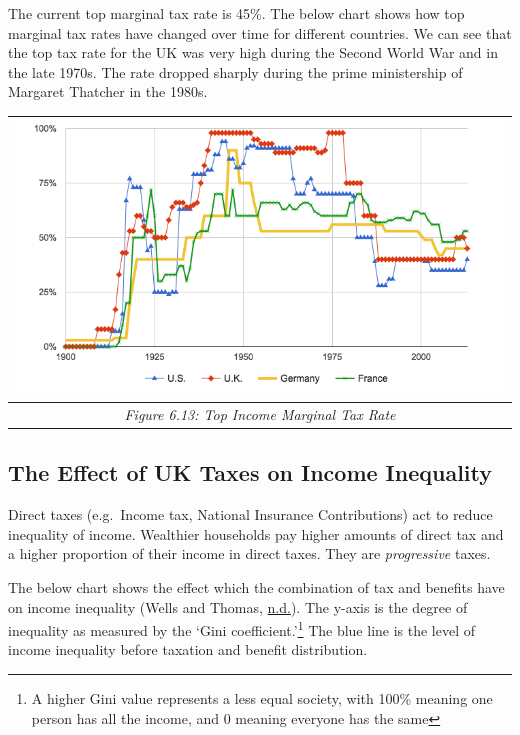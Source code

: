 \documentclass[]{tufte-handout}
\begin{document}
The current top marginal tax rate is 45\%. The below chart shows how top
marginal tax rates have changed over time for different countries. We
can see that the top tax rate for the UK was very high during the Second
World War and in the late 1970s. The rate dropped sharply during the
prime ministership of Margaret Thatcher in the 1980s.

\begin{longtable}[]{@{}c@{}}
\toprule
\includegraphics{ChapterPictures/6-12-TopIncomeMTR.png}\tabularnewline
\midrule
\endhead
\emph{Figure 6.13: Top Income Marginal Tax Rate}\tabularnewline
\bottomrule
\end{longtable}

\hypertarget{the-effect-of-uk-taxes-on-income-inequality}{%
\subsection{The Effect of UK Taxes on Income
Inequality}\label{the-effect-of-uk-taxes-on-income-inequality}}

Direct taxes (e.g.~Income tax, National Insurance Contributions) act to
reduce inequality of income. Wealthier households pay higher amounts of
direct tax and a higher proportion of their income in direct taxes. They
are \emph{progressive} taxes.

The below chart shows the effect which the combination of tax and
benefits have on income inequality (Wells and Thomas,
\protect\hyperlink{ref-Wells}{n.d.}). The y-axis is the degree of
inequality as measured by the `Gini coefficient.'\footnote{A higher Gini
  value represents a less equal society, with 100\% meaning one person
  has all the income, and 0 meaning everyone has the same} The blue line
is the level of income inequality before taxation and benefit
distribution.
\end{document}
